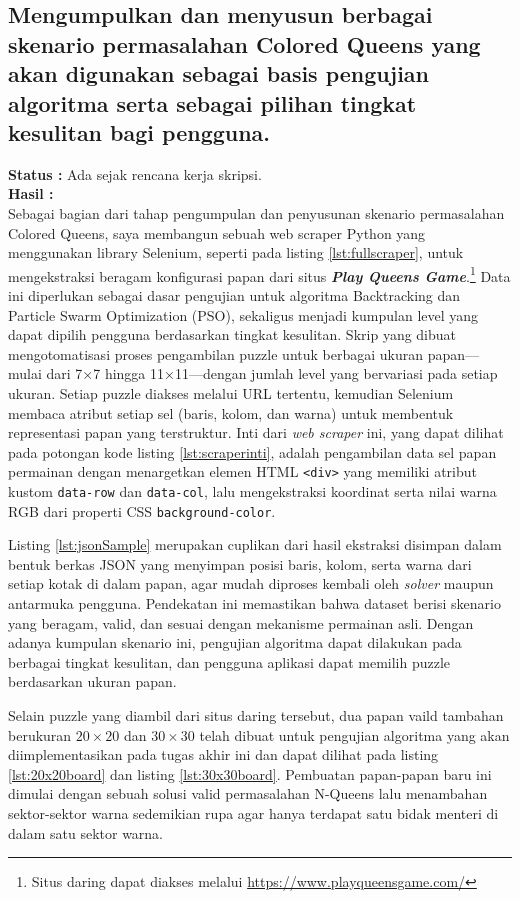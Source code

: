 \documentclass[a4paper,twoside]{article}
\begin{document}
	\subsection{Mengumpulkan dan menyusun berbagai skenario permasalahan Colored Queens yang akan digunakan sebagai basis pengujian algoritma serta sebagai pilihan tingkat kesulitan bagi pengguna.}
	{\bf Status :} Ada sejak rencana kerja skripsi.\\
	{\bf Hasil :}\\
	Sebagai bagian dari tahap pengumpulan dan penyusunan skenario permasalahan Colored Queens, saya membangun sebuah web scraper Python yang menggunakan library Selenium, seperti pada listing \ref{lst:fullscraper},  untuk mengekstraksi beragam konfigurasi papan dari situs \textbf{\textit{Play Queens Game}}.\footnote{Situs daring dapat diakses melalui \url{https://www.playqueensgame.com/}} Data ini diperlukan sebagai dasar pengujian untuk algoritma Backtracking dan Particle Swarm Optimization (PSO), sekaligus menjadi kumpulan level yang dapat dipilih pengguna berdasarkan tingkat kesulitan. Skrip yang dibuat mengotomatisasi proses pengambilan puzzle untuk berbagai ukuran papan—mulai dari 7×7 hingga 11×11—dengan jumlah level yang bervariasi pada setiap ukuran. Setiap puzzle diakses melalui URL tertentu, kemudian Selenium membaca atribut setiap sel (baris, kolom, dan warna) untuk membentuk representasi papan yang terstruktur. Inti dari \textit{web scraper} ini, yang dapat dilihat pada potongan kode listing \ref{lst:scraperinti}, adalah pengambilan data sel papan permainan dengan menargetkan elemen HTML \texttt{<div>} yang memiliki atribut kustom \texttt{data-row} dan \texttt{data-col}, lalu mengekstraksi koordinat serta nilai warna RGB dari properti CSS \texttt{background-color}. 
	
	Listing \ref{lst:jsonSample} merupakan cuplikan dari hasil ekstraksi disimpan dalam bentuk berkas JSON yang menyimpan posisi baris, kolom, serta warna dari setiap kotak di dalam papan, agar mudah diproses kembali oleh \textit{solver} maupun antarmuka pengguna. Pendekatan ini memastikan bahwa dataset berisi skenario yang beragam, valid, dan sesuai dengan mekanisme permainan asli. Dengan adanya kumpulan skenario ini, pengujian algoritma dapat dilakukan pada berbagai tingkat kesulitan, dan pengguna aplikasi dapat memilih puzzle berdasarkan ukuran papan. 
	
	Selain puzzle yang diambil dari situs daring tersebut, dua papan vaild tambahan berukuran $20 \times 20$ dan $30 \times 30$ telah dibuat untuk pengujian algoritma yang akan diimplementasikan pada tugas akhir ini dan dapat dilihat pada listing {\ref{lst:20x20board}} dan listing {\ref{lst:30x30board}}. Pembuatan papan-papan baru ini dimulai dengan sebuah solusi valid permasalahan N-Queens lalu menambahan sektor-sektor warna sedemikian rupa agar hanya terdapat satu bidak menteri di dalam satu sektor warna.
	
\end{document}
